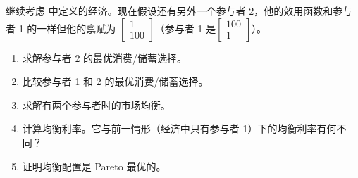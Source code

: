 \par\noindent
\begin{minipage}{\linewidth}
\begin{problem}
 继续考虑 中定义的经济。现在假设还有另外一个参与者 2，他的效用函数和参与者 1 的一样但他的禀赋为 $\begin{bmatrix}1 \\ 100\end{bmatrix}$（参与者 1 是$\begin{bmatrix}100 \\ 1\end{bmatrix}$）。
\begin{enumerate}[label=(\alph*)]
    \item 求解参与者 2 的最优消费/储蓄选择。
    \item 比较参与者 1 和 2 的最优消费/储蓄选择。
    \item 求解有两个参与者时的市场均衡。
    \item 计算均衡利率。它与前一情形（经济中只有参与者 1）下的均衡利率有何不同？
    \item 证明均衡配置是 Pareto 最优的。
\end{enumerate}
\end{problem}
\end{minipage}\par

